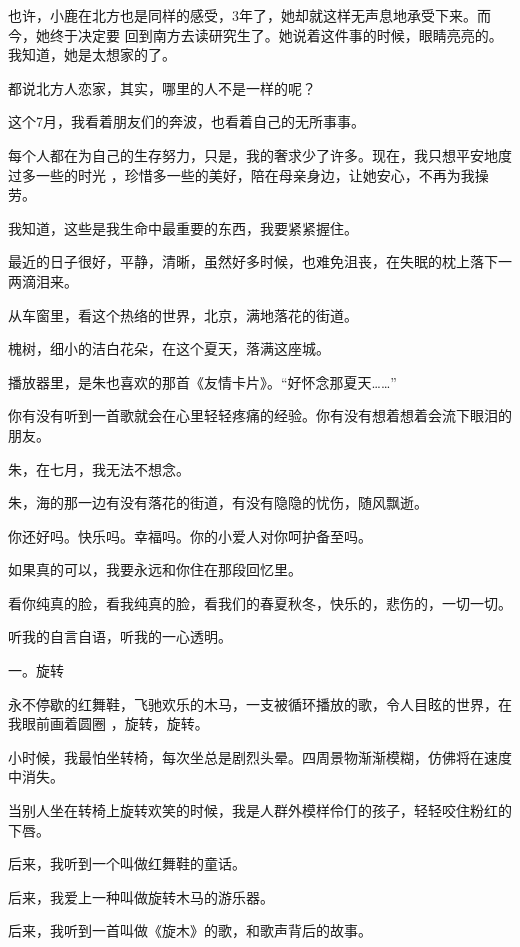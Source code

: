 \documentclass[12pt,a4paper]{article}
\def\blankrev{\vspace{1ex}}									%
\newcommand{\subpart}[1]{
	\begingroup \par
	\vspace{1ex} \centering #1
	\par \endgroup \nopagebreak[4]
}
\begin{document}
		也许，小鹿在北方也是同样的感受，3年了，她却就这样无声息地承受下来。而今，她终于决定要
	回到南方去读研究生了。她说着这件事的时候，眼睛亮亮的。我知道，她是太想家的了。

		都说北方人恋家，其实，哪里的人不是一样的呢？

		这个7月，我看着朋友们的奔波，也看着自己的无所事事。

		每个人都在为自己的生存努力，只是，我的奢求少了许多。现在，我只想平安地度过多一些的时光
	，珍惜多一些的美好，陪在母亲身边，让她安心，不再为我操劳。

		我知道，这些是我生命中最重要的东西，我要紧紧握住。

		最近的日子很好，平静，清晰，虽然好多时候，也难免沮丧，在失眠的枕上落下一两滴泪来。

	\endwriting



		从车窗里，看这个热络的世界，北京，满地落花的街道。

		槐树，细小的洁白花朵，在这个夏天，落满这座城。

		播放器里，是朱也喜欢的那首《友情卡片》。“好怀念那夏天……”

		你有没有听到一首歌就会在心里轻轻疼痛的经验。你有没有想着想着会流下眼泪的朋友。

		朱，在七月，我无法不想念。

		朱，海的那一边有没有落花的街道，有没有隐隐的忧伤，随风飘逝。

		你还好吗。快乐吗。幸福吗。你的小爱人对你呵护备至吗。

		如果真的可以，我要永远和你住在那段回忆里。

		看你纯真的脸，看我纯真的脸，看我们的春夏秋冬，快乐的，悲伤的，一切一切。

	\endwriting




		听我的自言自语，听我的一心透明。


		\subpart{一。旋转}

		永不停歇的红舞鞋，飞驰欢乐的木马，一支被循环播放的歌，令人目眩的世界，在我眼前画着圆圈
	，旋转，旋转。

		小时候，我最怕坐转椅，每次坐总是剧烈头晕。四周景物渐渐模糊，仿佛将在速度中消失。\par
		当别人坐在转椅上旋转欢笑的时候，我是人群外模样伶仃的孩子，轻轻咬住粉红的下唇。

		\blankrev
		后来，我听到一个叫做红舞鞋的童话。\par
		后来，我爱上一种叫做旋转木马的游乐器。\par
		后来，我听到一首叫做《旋木》的歌，和歌声背后的故事。
\end{document}
